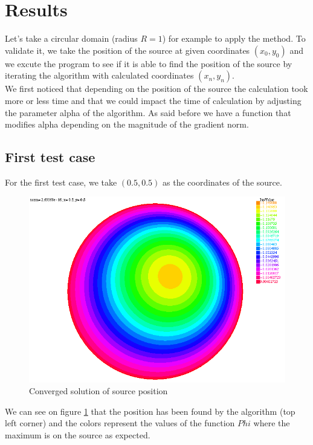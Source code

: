 \section{Results}

Let's take a circular domain (radius $R=1$) for example to apply the method. To validate it, we take the position of the source at given coordinates $(x_0, y_0)$ and we excute the program to see if it is able to find the position of the source by iterating the algorithm with calculated coordinates $(x_n, y_n)$.\\
We first noticed that depending on the position of the source the calculation took more or less time and that we could impact the time of calculation by adjusting the parameter alpha of the algorithm. As said before we have a function that modifies alpha depending on the magnitude of the gradient norm. \\

\subsection{First test case}

For the first test case, we take $(0.5, 0.5)$ as the coordinates of the source. \\
\begin{figure}[H]
	\centering
	\includegraphics[scale=0.7]{0505.png}
	\caption{Converged solution of source position}
	\label{0505}
\end{figure}
We can see on figure \ref{0505} that the position has been found by the algorithm (top left corner) and the colors represent the values of the function $Phi$ where the maximum is on the source as expected.

